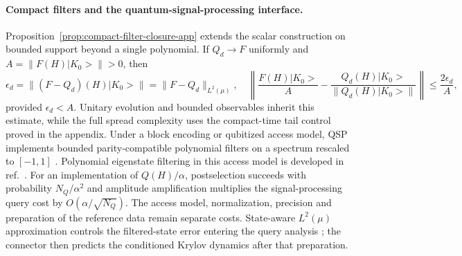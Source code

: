 \documentclass[a4paper,11pt]{article}
\def\ket#1{|#1>}%
\theoremstyle{definition}
\theoremstyle{remark}
\newcommand{\ket}[1]{|#1\rangle}
\begin{document}
\paragraph{Compact filters and the quantum-signal-processing interface.}
Proposition~\ref{prop:compact-filter-closure-app} extends the scalar construction on bounded
support beyond a single polynomial.  If $Q_d\to F$ uniformly and
$A=\|F(H)\ket{K_0}\|>0$, then
\begin{equation}
   \epsilon_d=\|(F-Q_d)(H)\ket{K_0}\|
   =\|F-Q_d\|_{L^2(\mu)},
   \quad
   \left\|
      \frac{F(H)\ket{K_0}}{A}
      -\frac{Q_d(H)\ket{K_0}}{\|Q_d(H)\ket{K_0}\|}
   \right\|\le\frac{2\epsilon_d}{A},
   \label{eq:qsp-state-aware-approximation}
\end{equation}
provided $\epsilon_d<A$.  Unitary evolution and bounded observables inherit this estimate, while
the full spread complexity uses the compact-time tail control proved in the appendix.  Under a
block encoding or qubitized access model, QSP implements bounded parity-compatible polynomial
filters on a spectrum rescaled to $[-1,1]$
\cite{GilyenSuLowWiebe2019}.  Polynomial eigenstate filtering in this access model is developed in
ref.~\cite{LinTong2020Filtering}.  For an implementation of
$Q(H)/\alpha$, postselection succeeds with probability $N_Q/\alpha^2$ and amplitude amplification
multiplies the signal-processing query cost by $O(\alpha/\sqrt{N_Q})$.  The access model,
normalization, precision and preparation of the reference data remain separate costs.  State-aware
$L^2(\mu)$ approximation controls the filtered-state error entering the query analysis
 \cite{Adhikari2026Query}; the connector then predicts the conditioned Krylov dynamics after
that preparation.
\end{document}
